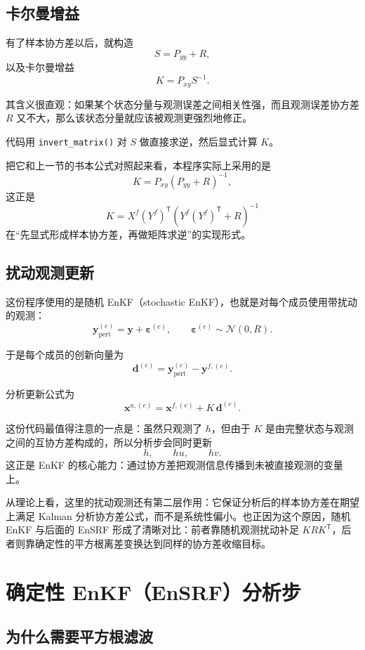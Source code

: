 \documentclass[12pt,a4paper]{article}
\begin{document}
\subsection{卡尔曼增益}

有了样本协方差以后，就构造
\[
S = P_{yy} + R,
\]
以及卡尔曼增益
\[
K = P_{xy}S^{-1}.
\]

其含义很直观：如果某个状态分量与观测误差之间相关性强，而且观测误差协方差 $R$ 又不大，那么该状态分量就应该被观测更强烈地修正。

代码用 \texttt{invert\_matrix()} 对 $S$ 做直接求逆，然后显式计算 $K$。

把它和上一节的书本公式对照起来看，本程序实际上采用的是
\[
K = P_{xy}(P_{yy}+R)^{-1},
\]
这正是
\[
K = X^f (Y^f)^{\mathsf T}\left(Y^f (Y^f)^{\mathsf T}+R\right)^{-1}
\]
在“先显式形成样本协方差，再做矩阵求逆”的实现形式。

\subsection{扰动观测更新}

这份程序使用的是随机 EnKF（stochastic EnKF），也就是对每个成员使用带扰动的观测：
\[
\mathbf{y}^{(e)}_{\mathrm{pert}}
= \mathbf{y} + \boldsymbol{\varepsilon}^{(e)},
\qquad
\boldsymbol{\varepsilon}^{(e)} \sim \mathcal{N}(0,R).
\]

于是每个成员的创新向量为
\[
\mathbf{d}^{(e)}
= \mathbf{y}^{(e)}_{\mathrm{pert}} - \mathbf{y}^{f,(e)}.
\]

分析更新公式为
\[
\mathbf{x}^{a,(e)}
= \mathbf{x}^{f,(e)} + K\,\mathbf{d}^{(e)}.
\]

这份代码最值得注意的一点是：虽然只观测了 $h$，但由于 $K$ 是由完整状态与观测之间的互协方差构成的，所以分析步会同时更新
\[
h,\qquad hu,\qquad hv.
\]
这正是 EnKF 的核心能力：通过协方差把观测信息传播到未被直接观测的变量上。

从理论上看，这里的扰动观测还有第二层作用：它保证分析后的样本协方差在期望上满足 Kalman 分析协方差公式，而不是系统性偏小。也正因为这个原因，随机 EnKF 与后面的 EnSRF 形成了清晰对比：前者靠随机观测扰动补足 $K R K^{\mathsf T}$，后者则靠确定性的平方根离差变换达到同样的协方差收缩目标。

\section{确定性 EnKF（EnSRF）分析步}

\subsection{为什么需要平方根滤波}
\end{document}
